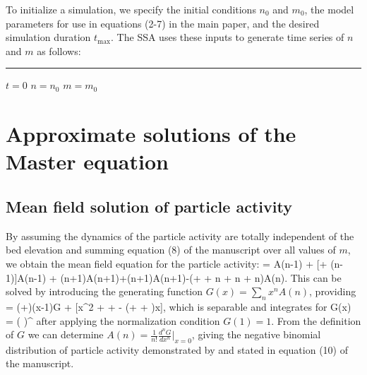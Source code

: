 To initialize a simulation, we specify the initial conditions $n_0$ and $m_0$, the model parameters for use in equations (2-7) in the main paper, and the desired simulation duration $t_\text{max}$. The SSA uses these inputs to generate time series of $n$ and $m$ as follows:

\rule{\linewidth}{1pt}

\begin{algorithmic}
	\State $t = 0$ 
	\State $n = n_0$
	\State $m =  m_0$
	
	\EndWhile
\end{algorithmic}

\section{Approximate solutions of the Master equation}

\subsection{Mean field solution of particle activity}

By assuming the dynamics of the particle activity are totally independent of the bed elevation and summing equation (8) of the manuscript over all values of $m$, we obtain the mean field equation for the particle activity: 
 = \nu A(n-1) + [\lambda + \mu(n-1)]A(n-1) + \sigma(n+1)A(n+1)+\gamma(n+1)A(n+1)-(\nu  + \lambda + \mu n + \sigma n + \gamma n)A(n).\ee
This can be solved by introducing the generating function \citep{Cox1965} $G(x) = \sum_n x^n A(n)$, providing
 = (\nu+\lambda)(x-1)G + [\mu x^2 + \sigma + \gamma - (\mu + \sigma + \gamma)x],\ee
which is separable and integrates for 
\be G(x) = \Bigg( \Bigg)^{\frac{\nu + \lambda}{\mu}}\ee
after applying the normalization condition $G(1)=1$.
From the definition of $G$ we can determine $A(n) = \frac{1}{n!} \frac{d^nG}{dx^n}|_{x=0}$, giving the negative binomial distribution of particle activity demonstrated by \citet{Ancey2008} and stated in equation (10) of the manuscript.


